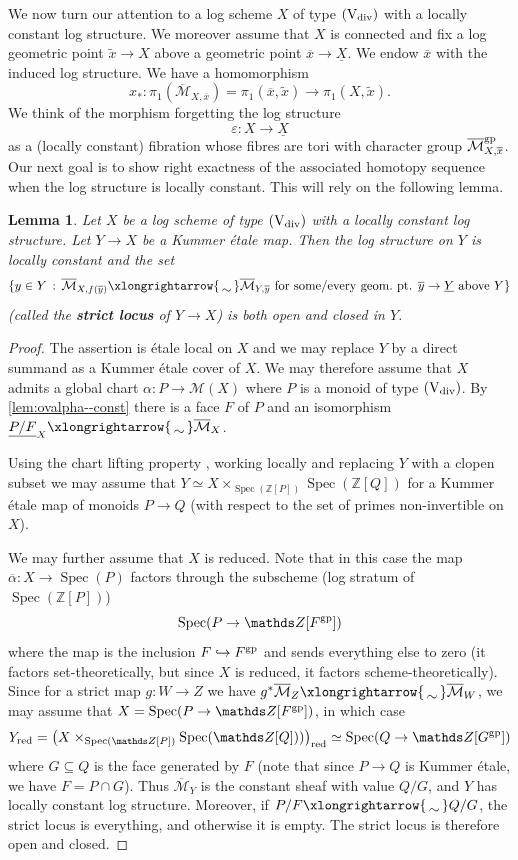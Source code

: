 \documentclass[a4paper,twoside,11pt,reqno]{amsart}
\renewcommand{\mathbb}{\mathds}
\newcommand{\bZ}{{\mathbb Z}}
\newcommand{\cM}{{\mathcal M}}
\newcommand{\isomto}{\xlongrightarrow{\,\smash{\raisebox{-0.65ex} 
    {\ensuremath{\displaystyle\sim}}}\,}}
\newcommand{\la}{\longrightarrow}
\DeclareMathOperator{\Spec}{Spec}
\newcommand{\gp}{{\rm gp}}
\newcommand{\ov}[1]{\overline{#1}}
\newcommand{\ep}{\varepsilon}
\newcommand{\typeVd}{(\mathrm{V}_{\rm div})}
\newtheorem{lem}[thm]{Lemma}
\theoremstyle{definition}
\numberwithin{equation}{subsection}
\begin{document}
We now turn our attention to a log scheme $X$ of type $\typeVd$ with a locally constant log structure.
We moreover assume that $X$ is connected and fix a log geometric point $\tilde{x} \to X$ above a geometric point $\ov{x} \to \underline{X}$. We endow $\ov{x}$ with the induced log structure. We have a homomorphism
\[
     x_\ast \colon \pi_1(\overline{\cM}_{X,\ov x}) = \pi_1(\ov x,\tilde x) \la \pi_1(X, \tilde x).
\]
We think of the morphism forgetting the log structure
\[
    \ep\colon X \la \underline{X}
\]
as a (locally constant) fibration whose fibres are tori with character group $\overline{\cM}_{X,\ov x}^\gp$. Our next goal is to show right exactness of the associated homotopy sequence when the log structure is locally constant. This will rely on the following lemma. 

\begin{lem}
\label{lem:strict-locus-clopen}
    Let $X$ be a log scheme of type $\typeVd$ with a locally constant log structure. Let $Y\to X$ be a Kummer \'etale map. Then the log structure on $Y$ is locally constant and the set 
    \[ 
        \{ y\in Y \,:\, \ov{\cM}_{X,f(\ov y)}\isomto \ov{\cM}_{Y,\ov y} \text{ for some/every geom.\ pt. $\ov y\to \underline{Y}$ above $Y$}\}
    \]
    (called the {\bf strict locus} of $Y\to X$) is both open and closed in $Y$.
\end{lem}

\begin{proof}
The assertion is \'etale local on $X$ and we may replace $Y$ by a direct summand as a Kummer \'etale cover of $X$. We may therefore assume that $X$ admits a global chart $\alpha \colon P \to \cM(X)$ where $P$ is a monoid of type $\typeVd$. By \cref{lem:ovalpha--const} there is a face $F$ of $P$ and an isomorphism $\underline{P/F}_X \isomto \overline{\cM}_X$.

Using the chart lifting property \cite[Proposition~3.5.8]{AHLS-Log}, working locally and replacing $Y$ with a clopen subset we may assume that $Y\simeq X\times_{\Spec(\bZ[P])}\Spec(\bZ[Q])$ for a Kummer \'etale map of monoids $P\to Q$ (with respect to the set of primes non-invertible on $X$). 

We may further assume that $X$ is reduced. Note that in this case the map $\ov\alpha : X \to \Spec(P)$ factors through the subscheme (log stratum of $\Spec(\bZ[P])$)
\[ 
    \Spec(P\to \bZ[F^\gp])
\]
where the map is the inclusion $F\hookrightarrow F^\gp$ and sends everything else to zero (it factors set-theoretically, but since $X$ is reduced, it factors scheme-theoretically). Since for a strict map $g\colon W\to Z$ we have $g^*\ov{\cM}_Z\isomto \ov{\cM}_W$, we may assume that $X = \Spec(P\to \bZ[F^\gp])$, in which case 
\[ 
    Y_{\rm red} = \left(X\times_{\Spec(\bZ[P])}\Spec(\bZ[Q]))\right)_{\rm red} \simeq \Spec(Q\to \bZ[G^\gp])
\]
where $G\subseteq Q$ is the face generated by $F$ (note that since $P\to Q$ is Kummer \'etale, we have $F = P\cap G$). Thus $\overline{\cM}_Y$ is the constant sheaf with value $Q/G$, and $Y$ has locally constant log structure. Moreover, if $P/F\isomto Q/G$, the strict locus is everything, and otherwise it is empty. The strict locus is therefore open and closed.
\end{proof}
\end{document}
